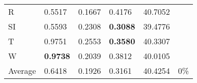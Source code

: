 \documentclass[11pt, a4paper]{article}
\begin{document}
\begin{table}[H]
\begin{tabular}{llllll}
R                                & 0.5517                            & 0.1667                            & 0.4176                               & 40.7052                                     &                                   \\
SI                        & 0.5593                            & 0.2308                            & \textbf{0.3088}                      & 39.4776                                     &                                   \\
T                              & 0.9751                            & 0.2553                            & \textbf{0.3580}                      & 40.3307                                     &                                   \\
W                             & \textbf{0.9738}                   & 0.2039                            & 0.3812                               & 40.0105                                     &                                   \\ \hline
Average                               & 0.6418                            & 0.1926                            & 0.3161                               & 40.4254                                     & 0\%
\end{tabular}
\end{table}
\end{document}
